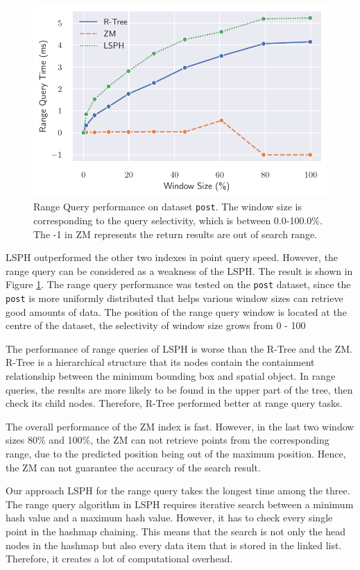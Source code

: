 \begin{figure}
    \includegraphics[width=\textwidth]{Figures/range_result.pdf}\hfill
    \caption{Range Query performance on dataset \texttt{post}. The window size is corresponding to the query selectivity, which is between 0.0-100.0\%. The -1 in ZM represents the return results are out of search range.}\label{fig:range_result}
\end{figure}

LSPH outperformed the other two indexes in point query speed. However, the range query can be considered as a weakness of the LSPH. The result is shown in Figure \ref{fig:range_result}. The range query performance was tested on the \texttt{post} dataset, since the \texttt{post} is more uniformly distributed that helps various window sizes can retrieve good amounts of data. The position of the range query window is located at the centre of the dataset, the selectivity of window size grows from 0 - 100 %

The performance of range queries of LSPH is worse than the R-Tree and the ZM. R-Tree is a hierarchical structure that its nodes contain the containment relationship between the minimum bounding box and spatial object. In range queries, the results are more likely to be found in the upper part of the tree, then check its child nodes. Therefore, R-Tree performed better at range query tasks. 

The overall performance of the ZM index is fast. However, in the last two window sizes 80\% and 100\%, the ZM can not retrieve points from the corresponding range, due to the predicted position being out of the maximum position. Hence, the ZM can not guarantee the accuracy of the search result. 

Our approach LSPH for the range query takes the longest time among the three. The range query algorithm in LSPH requires iterative search between a minimum hash value and a maximum hash value. However, it has to check every single point in the hashmap chaining. This means that the search is not only the head nodes in the hashmap but also every data item that is stored in the linked list. Therefore, it creates a lot of computational overhead. 
